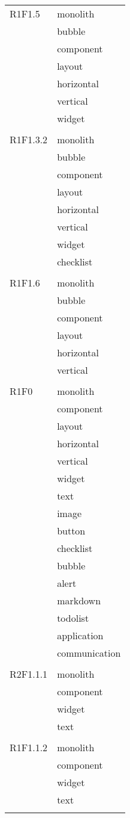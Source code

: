 \begin{center}
\begin{longtable}{|p{7cm}|p{7cm}|}
		R1F1.5 & monolith \\ & bubble \\ & component \\ & layout \\ & horizontal \\ & vertical \\ & widget \\ & \\ \hline
		R1F1.3.2 & monolith \\ & bubble \\ & component \\ & layout \\ & horizontal \\ & vertical \\ & widget \\ & checklist \\ & \\ \hline
		R1F1.6 & monolith \\ & bubble \\ & component \\ & layout \\ & horizontal \\ & vertical \\ & \\ \hline
		R1F0 & monolith \\ & component \\ & layout \\ & horizontal \\ & vertical \\ & widget \\ & text \\ & image \\ & button \\ & checklist \\ & bubble \\ & alert \\ & markdown \\ & todolist \\ & application \\ & communication \\ & \\ \hline
		R2F1.1.1 & monolith \\ & component \\ & widget \\ & text \\ & \\ \hline
		R1F1.1.2 & monolith \\ & component \\ & widget \\ & text \\ & \\ \hline

\end{longtable}
\end{center}
